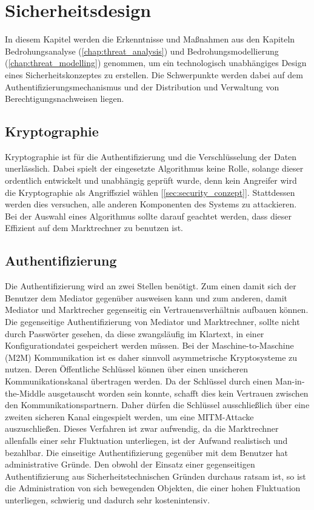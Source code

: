 \documentclass[11pt,a4paper]{report}
\begin{document}
\chapter{Sicherheitsdesign} \label{chap:design}

In diesem Kapitel werden die Erkenntnisse und Maßnahmen aus den Kapiteln Bedrohungsanalyse (\ref{chap:threat_analysis}) und Bedrohungsmodellierung (\ref{chap:threat_modelling}) genommen, um ein technologisch unabhängiges Design eines Sicherheitskonzeptes zu erstellen. Die Schwerpunkte werden dabei auf dem Authentifizierungsmechanismus und der Distribution und Verwaltung von Berechtigungsnachweisen liegen.

\section{Kryptographie}

Kryptographie ist für die Authentifizierung und die Verschlüsselung der Daten unerlässlich. Dabei spielt der eingesetzte Algorithmus keine Rolle, solange dieser ordentlich entwickelt und unabhängig geprüft wurde, denn kein Angreifer wird die Kryptographie als Angriffsziel wählen [\ref{sec:security_conzept}]. Stattdessen werden dies versuchen, alle anderen Komponenten des Systems zu attackieren. Bei der Auswahl eines Algorithmus sollte darauf geachtet werden, dass dieser Effizient auf dem Marktrechner zu benutzen ist.

\section{Authentifizierung}

Die Authentifizierung wird an zwei Stellen benötigt. Zum einen damit sich der Benutzer dem Mediator gegenüber ausweisen kann und zum anderen, damit Mediator und Marktrecher gegenseitig ein Vertrauensverhältnis aufbauen können. Die gegenseitige Authentifizierung von Mediator und Marktrechner, sollte nicht durch Passwörter gesehen, da diese zwangsläufig im Klartext, in einer Konfigurationdatei gespeichert werden müssen. Bei der Maschine-to-Maschine (M2M) Kommunikation ist es daher sinnvoll asymmetrische Kryptosysteme zu nutzen. Deren Öffentliche Schlüssel können über einen unsicheren Kommunikationskanal übertragen werden. Da der Schlüssel durch einen Man-in-the-Middle ausgetauscht worden sein konnte, schafft dies kein Vertrauen zwischen den Kommunikationspartnern. Daher dürfen die Schlüssel ausschließlich über eine zweiten sicheren Kanal eingespielt werden, um eine MITM-Attacke auszuschließen. Dieses Verfahren ist zwar aufwendig, da die Marktrechner allenfalls einer sehr Fluktuation unterliegen, ist der Aufwand realistisch und bezahlbar. Die einseitige Authentifizierung gegenüber mit dem Benutzer hat administrative Gründe. Den obwohl der Einsatz einer gegenseitigen Authentifizierung aus Sicherheitstechnischen Gründen durchaus ratsam ist, so ist die Administration von sich bewegenden Objekten, die einer hohen Fluktuation unterliegen, schwierig und dadurch sehr kostenintensiv.
\end{document}
